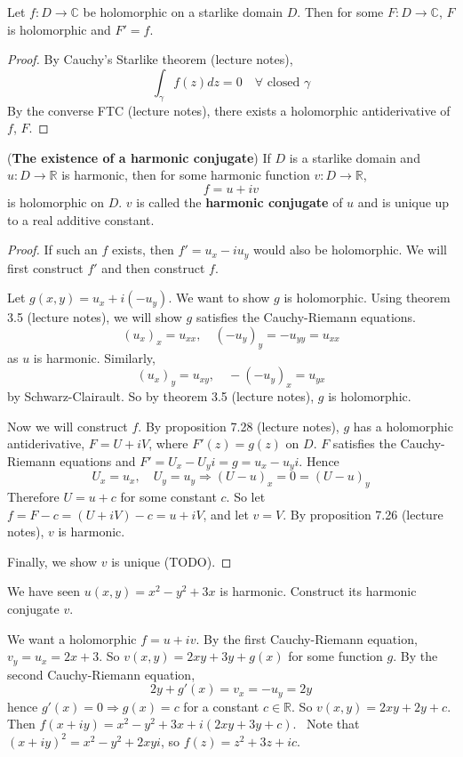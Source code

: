 \begin{proposition}
	Let $f: D \rightarrow \mathbb{C}$ be holomorphic on a starlike domain $D$. Then for some $F: D \rightarrow \mathbb{C}$, $F$ is holomorphic and $F' = f$.
\end{proposition}

\begin{proof}
	By Cauchy's Starlike theorem (lecture notes),
	\[
		\int_{\gamma} f(z) dz = 0 \quad \forall \text{ closed } \gamma
	\]
	By the converse FTC (lecture notes), there exists a holomorphic antiderivative of $f$, $F$.
\end{proof}

\begin{theorem}
	(\textbf{The existence of a harmonic conjugate}) If $D$ is a starlike domain and $u: D \rightarrow \mathbb{R}$ is harmonic, then for some harmonic function $v: D \rightarrow \mathbb{R}$,
	\[
		f = u + iv
	\]
	is holomorphic on $D$. $v$ is called the \textbf{harmonic conjugate} of $u$ and is unique up to a real additive constant.
\end{theorem}

\begin{proof}
	If such an $f$ exists, then $f' = u_x - i u_y$ would also be holomorphic. We will first construct $f'$ and then construct $f$.

	Let $g(x, y) = u_x + i (-u_y)$. We want to show $g$ is holomorphic. Using theorem 3.5 (lecture notes), we will show $g$ satisfies the Cauchy-Riemann equations.
	\[
		{(u_x)}_x = u_{xx}, \quad {(-u_y)}_y = -u_{yy} = u_{xx}
	\]
	as $u$ is harmonic. Similarly,
	\[
		{(u_x)}_y = u_{xy}, \quad -{(-u_y)}_x = u_{yx}
	\]
	by Schwarz-Clairault. So by theorem 3.5 (lecture notes), $g$ is holomorphic.

	Now we will construct $f$. By proposition 7.28 (lecture notes), $g$ has a holomorphic antiderivative, $F = U + iV$, where $F'(z) = g(z)$ on $D$. $F$ satisfies the Cauchy-Riemann equations and $F' = U_x - U_y i = g = u_x - u_y i$. Hence
	\[
		U_x = u_x, \quad U_y = u_y \Longrightarrow {(U - u)}_x = 0 = {(U - u)}_y
	\]
	Therefore $U = u + c$ for some constant $c$. So let $f = F - c = (U + iV) - c = u + iV$, and let $v = V$. By proposition 7.26 (lecture notes), $v$ is harmonic.

	Finally, we show $v$ is unique (TODO).
\end{proof}

\begin{example}
	We have seen $u(x, y) = x^2 - y^2 + 3x$ is harmonic. Construct its harmonic conjugate $v$.

	We want a holomorphic $f = u + iv$. By the first Cauchy-Riemann equation, $v_y = u_x = 2x + 3$. So $v(x, y) = 2xy + 3y + g(x)$ for some function $g$. By the second Cauchy-Riemann equation,
	\[
		2y + g'(x) = v_x = -u_y = 2y
	\]
	hence $g'(x) = 0 \Longrightarrow g(x) = c$ for a constant $c \in \mathbb{R}$. So $v(x, y) = 2xy + 2y + c$. Then $f(x + iy) = x^2 - y^2 + 3x + i(2xy + 3y + c)$.
	\
	Note that ${(x + iy)}^2 = x^2 - y^2 + 2xyi$, so $f(z) = z^2 + 3z + ic$.
\end{example}

